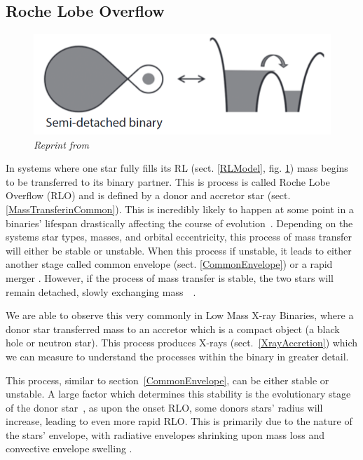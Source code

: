 \documentclass[12pt, a4paper]{article}
\begin{document}
        \subsection{\centering Roche Lobe Overflow}\label{RLO} %

        \begin{figure}[h] 
            \centering
            \includegraphics[scale = .4]{Figs/Semi-detached binary.png}
            \caption{\textit{Reprint from~\cite{TaurisvandenHeuvel+2023}}}
            \label{SemidetachedRL}
        \end{figure}

        In systems where one star fully fills its RL (sect. \ref{RLModel}, fig. \ref{SemidetachedRL}) mass begins to be transferred to its binary partner. This is process is called Roche Lobe Overflow (RLO) and is defined by a donor and accretor star (sect. \ref{MassTransferinCommon}). This is incredibly likely to happen at some point in a binaries' lifespan drastically affecting the course of evolution~\cite{TaurisvandenHeuvel+2023}\cite{Chen_2024}. Depending on the systems star types, masses, and orbital eccentricity, this process of mass transfer will either be stable or unstable. When this process if unstable, it leads to either another stage called common envelope (sect. \ref{CommonEnvelope}) or a rapid merger \cite{TaurisvandenHeuvel+2023}. However, if the process of mass transfer is stable, the two stars will remain detached, slowly exchanging mass~\cite{Chen_2024}~\cite{TaurisvandenHeuvel+2023}.

        We are able to observe this very commonly in Low Mass X-ray Binaries, where a donor star transferred mass to an accretor which is a compact object (a black hole or neutron star). This process produces X-rays (sect.~\ref{XrayAccretion}) which we can measure to understand the processes within the binary in greater detail.

        This process, similar to section~\ref{CommonEnvelope}, can be either stable or unstable. A large factor which determines this stability is the evolutionary stage of the donor star~\cite{TaurisvandenHeuvel+2023}, as upon the onset RLO, some donors stars' radius will increase, leading to even more rapid RLO. This is primarily due to the nature of the stars' envelope, with radiative envelopes shrinking upon mass loss and convective envelope swelling \cite{TaurisvandenHeuvel+2023}.
        
\end{document}
